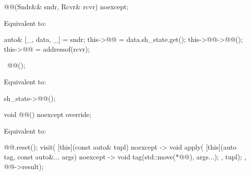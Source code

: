 \begin{itemdecl}
@@(Sndr&& sndr, Rcvr& rcvr) noexcept;
\end{itemdecl}

\begin{itemdescr}
\pnum
\effects
Equivalent to:
\begin{codeblock}
auto& [_, data, _] = sndr;
this->@@ = data.sh_state.get();
this->@@->@@();
this->@@ = addressof(rcvr);
\end{codeblock}
\end{itemdescr}

\begin{itemdecl}
~@@();
\end{itemdecl}

\begin{itemdescr}
\pnum
\effects
Equivalent to:
\begin{codeblock}
sh_state->@@();
\end{codeblock}
\end{itemdescr}

\begin{itemdecl}
void @@() noexcept override;
\end{itemdecl}

\begin{itemdescr}
\pnum
\effects
Equivalent to:
\begin{codeblock}
@@.reset();
visit(
  [this](const auto& tupl) noexcept -> void {
    apply(
      [this](auto tag, const auto&... args) noexcept -> void {
        tag(std::move(*@@), args...);
      },
      tupl);
  },
  @@->result);
\end{codeblock}
\end{itemdescr}

